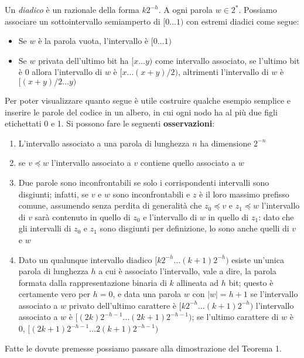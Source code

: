 Un \textit{diadico} è un razionale della forma $k2^{-h}$. A ogni parola $w \in 2^*$. Possiamo associare un sottointervallo semiamperto di $[0\dots1)$ con estremi diadici come segue:
\begin{itemize}
    \item Se $w$ è la parola vuota, l'intervallo è $[0\dots1)$
    \item Se $w$ privata dell'ultimo bit ha $[x \dots y)$ come intervallo associato, se l'ultimo bit è 0 allora l'intervallo di $w$ è $[x \dots (x + y)/2)$, altrimenti l'intervallo di $w$ è $[(x + y)/2 \dots y)$
\end{itemize}
Per poter visualizzare quanto segue è utile costruire qualche esempio semplice e inserire le parole del codice in un albero, in cui ogni nodo ha al più due figli etichettati 0 e 1. Si possono fare le seguenti \textbf{osservazioni}:
\begin{enumerate}
    \item L'intervallo associato a una parola di lunghezza $n$ ha dimensione $2^{-n}$
    \item se $v \preceq w$ l'intervallo associato a $v$ contiene quello associato a $w$
    \item Due parole sono inconfrontabili se solo i corrispondenti intervalli sono disgiunti; infatti, se $v$ e $w$ sono inconfrontabili e $z$ è il loro massimo prefisso comune, assumendo senza perdita di generalità che $z_0 \preceq v$ e $z_1 \preceq w$ l'intervallo di $v$ sarà contenuto in quello di $z_0$ e l'intervallo di $w$ in quello di $z_1$: dato che gli intervalli di $z_0$ e $z_1$ sono disgiunti per definizione, lo sono anche quelli di $v$ e $w$
    \item Dato un qualunque intervallo diadico $[k2^{-h} \dots (k + 1)2^{-h})$ esiste un'unica parola di lunghezza $h$ a cui è associato l'intervallo, vale a dire, la parola formata dalla rappresentazione binaria di $k$ allineata ad $h$ bit; questo è certamente vero per $h = 0$, e data una parola $w$ con $|w| = h + 1$ se l'intervallo associato a $w$ privato dell'ultimo carattere è $[k2^{-h} \dots (k + 1)2^{-h})$ l'intervallo associato a $w$ è $[(2k)2^{-h-1} \dots (2k + 1)2^{-h-1})$; se l'ultimo carattere di $w$ è 0, $[(2k + 1)2^{-h-1} \dots 2(k + 1)2^{-h-1})$
\end{enumerate}
Fatte le dovute premesse possiamo passare alla dimostrazione del Teorema 1.
